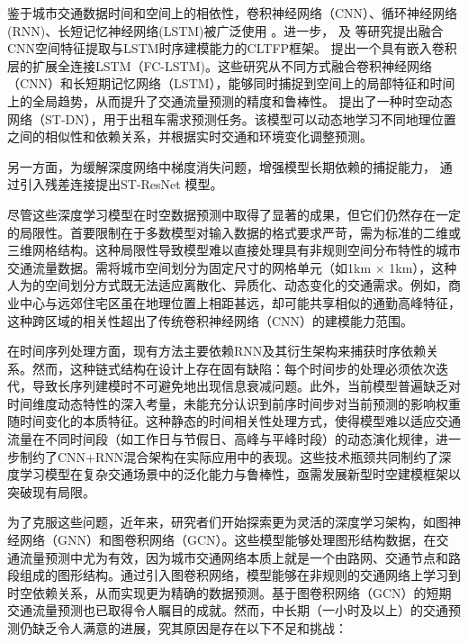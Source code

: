 鉴于城市交通数据时间和空间上的相依性，卷积神经网络（CNN）、循环神经网络(RNN)、长短记忆神经网络(LSTM)被广泛使用 \parencite{2017_Zhang_Deep_spatio_temporal_residual_networks_for_citywide_crowd_flows_prediction, 1997_Hochreiter_Long_short_term_memory}。进一步，\textcite{2016_Wu_Shortterm_traffic_flow_forecasting_with_spatial_temporal_correlation_in_a_hybrid_deep_learning_framework} 及 \textcite{2018_Yao_Deep_multi_view_spatial_temporal_network_for_taxi_demand_prediction} 等研究提出融合CNN空间特征提取与LSTM时序建模能力的CLTFP框架。\textcite{2015_Shi_Convolutional_lstm_network_A_machine_learning_approach_for_precipitation_nowcasting} 提出一个具有嵌入卷积层的扩展全连接LSTM（FC-LSTM)。这些研究从不同方式融合卷积神经网络（CNN）和长短期记忆网络（LSTM），能够同时捕捉到空间上的局部特征和时间上的全局趋势，从而提升了交通流量预测的精度和鲁棒性。\textcite{2018_Yao_Modeling_spatial_temporal_dynamics_for_traffic_prediction} 提出了一种时空动态网络（ST-DN），用于出租车需求预测任务。该模型可以动态地学习不同地理位置之间的相似性和依赖关系，并根据实时交通和环境变化调整预测。

另一方面，为缓解深度网络中梯度消失问题，增强模型长期依赖的捕捉能力，\textcite{2018_Zhang_Predicting_citywide_crowd_flows_using_deep_spatio_temporal_residual_networks} 通过引入残差连接提出ST-ResNet 模型。

尽管这些深度学习模型在时空数据预测中取得了显著的成果，但它们仍然存在一定的局限性。首要限制在于多数模型对输入数据的格式要求严苛，需为标准的二维或三维网格结构。这种局限性导致模型难以直接处理具有非规则空间分布特性的城市交通流量数据。需将城市空间划分为固定尺寸的网格单元（如1km $\times$ 1km），这种人为的空间划分方式既无法适应离散化、异质化、动态变化的交通需求。例如，商业中心与远郊住宅区虽在地理位置上相距甚远，却可能共享相似的通勤高峰特征，这种跨区域的相关性超出了传统卷积神经网络（CNN）的建模能力范围。

在时间序列处理方面，现有方法主要依赖RNN及其衍生架构来捕获时序依赖关系。然而，这种链式结构在设计上存在固有缺陷：每个时间步的处理必须依次迭代，导致长序列建模时不可避免地出现信息衰减问题。此外，当前模型普遍缺乏对时间维度动态特性的深入考量，未能充分认识到前序时间步对当前预测的影响权重随时间变化的本质特征。这种静态的时间相关性处理方式，使得模型难以适应交通流量在不同时间段（如工作日与节假日、高峰与平峰时段）的动态演化规律，进一步制约了CNN+RNN混合架构在实际应用中的表现。这些技术瓶颈共同制约了深度学习模型在复杂交通场景中的泛化能力与鲁棒性，亟需发展新型时空建模框架以突破现有局限。

为了克服这些问题，近年来，研究者们开始探索更为灵活的深度学习架构，如图神经网络（GNN）和图卷积网络（GCN）。这些模型能够处理图形结构数据，在交通流量预测中尤为有效，因为城市交通网络本质上就是一个由路网、交通节点和路段组成的图形结构。通过引入图卷积网络，模型能够在非规则的交通网络上学习到时空依赖关系，从而实现更为精确的数据预测。基于图卷积网络（GCN）的短期交通流量预测也已取得令人瞩目的成就。然而，中长期（一小时及以上）的交通预测仍缺乏令人满意的进展，究其原因是存在以下不足和挑战：

